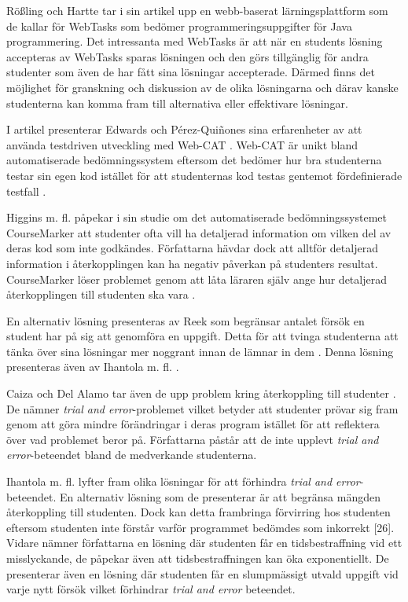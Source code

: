 \documentclass[a4paper,11pt]{article}
\begin{document}
{Rößling och Hartte tar i sin artikel \cite{webtasks} upp en webb-baserat lärningsplattform som de kallar för WebTasks som bedömer programmeringsuppgifter för Java programmering. Det intressanta med WebTasks är att när en students lösning accepteras av WebTasks sparas lösningen och den görs tillgänglig för andra studenter som även de har fått sina lösningar accepterade. Därmed finns det möjlighet för granskning och diskussion av de olika lösningarna och därav kanske studenterna kan komma fram till alternativa eller effektivare lösningar.

I artikel \cite{edwards_15} presenterar Edwards och Pérez-Quiñones sina erfarenheter av att använda testdriven utveckling med Web-CAT \cite{edwards_15}. Web-CAT är unikt bland automatiserade bedömningssystem eftersom det bedömer hur bra studenterna testar sin egen kod istället för att studenternas kod testas gentemot fördefinierade testfall \cite{edwards_15}.

Higgins m. fl. \cite{higgins_3} påpekar i sin studie om det automatiserade bedömningssystemet CourseMarker \cite{higgins_coursemarker_12} att studenter ofta vill ha detaljerad information om vilken del av deras kod som inte godkändes. Författarna hävdar dock att alltför detaljerad information i återkopplingen kan ha negativ påverkan på studenters resultat. CourseMarker löser problemet genom att låta läraren själv ange hur detaljerad återkopplingen till studenten ska vara \cite{higgins_3} \cite{caiza_7} \cite{douce_11}.

En alternativ lösning presenteras av Reek som begränsar antalet försök en student har på sig att genomföra en uppgift. Detta för att tvinga studenterna att tänka över sina lösningar mer noggrant innan de lämnar in dem \cite{reek_6}. Denna lösning presenteras även av Ihantola m. fl. \cite{ihantola}.

Caiza och Del Alamo tar även de upp problem kring återkoppling till studenter \cite{caiza_7}. De nämner \textit{trial and error}-problemet vilket betyder att studenter prövar sig fram genom att göra mindre förändringar i deras program istället för att reflektera över vad problemet beror på. Författarna påstår att de inte upplevt \textit{trial and error}-beteendet bland de medverkande studenterna.

Ihantola m. fl. \cite{ihantola} lyfter fram olika lösningar för att förhindra \textit{trial and error}-beteendet.  En alternativ lösning som de presenterar är att begränsa mängden återkoppling till studenten. Dock kan detta frambringa förvirring hos studenten eftersom studenten inte förstår varför programmet bedömdes som inkorrekt [26]. Vidare nämner författarna en lösning där studenten får en tidsbestraffning vid ett misslyckande, de påpekar även att tidsbestraffningen kan öka exponentiellt.
De presenterar även en lösning där studenten får en slumpmässigt utvald uppgift vid varje nytt försök vilket förhindrar \textit{trial and error} beteendet. 

}
\end{document}

